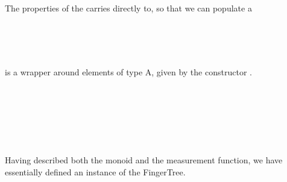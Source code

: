 \documentclass[12pt,twoside,notitlepage]{report}
\begin{document}
The properties of the  carries directly to, so that we can populate a 

\begin{code}
\\
\>[0]\<[2]%
\>[2]  \AgdaSymbol{:}  \AgdaSymbol{\{}\AgdaSymbol{\}}   \AgdaSymbol{(} \AgdaSymbol{\{}\AgdaSymbol{\})}\<%
\\
\>[0]\<[2]%
\>[2] \AgdaSymbol{=}       \<%
\\
\end{code}

  is a wrapper around elements of type A, given by the constructor .


\begin{code}
\\
\>[0]\<[2]%
\>[2] \AgdaSymbol{:}  \AgdaSymbol{\{}\AgdaSymbol{\}\{} \AgdaSymbol{:}  \AgdaSymbol{\}}  \AgdaSymbol{(} \AgdaSymbol{:}  \AgdaSymbol{)}   \AgdaSymbol{\{}\AgdaSymbol{\}}\<%
\\
\>[0]\<[2]%
\>[2]  \AgdaSymbol{=}  \<%
\\
%
\\
\>[0]\<[2]%
\>[2]  \AgdaSymbol{:} \AgdaSymbol{\}\{} \AgdaSymbol{:}  \AgdaSymbol{\}}   \AgdaSymbol{(} \AgdaSymbol{)} \<%
\\
\>[0]\<[2]%
\>[2] \AgdaSymbol{=}  \<%
\end{code}

Having described both the monoid and the measurement function, we have essentially defined an instance of the FingerTree.
\end{document}
